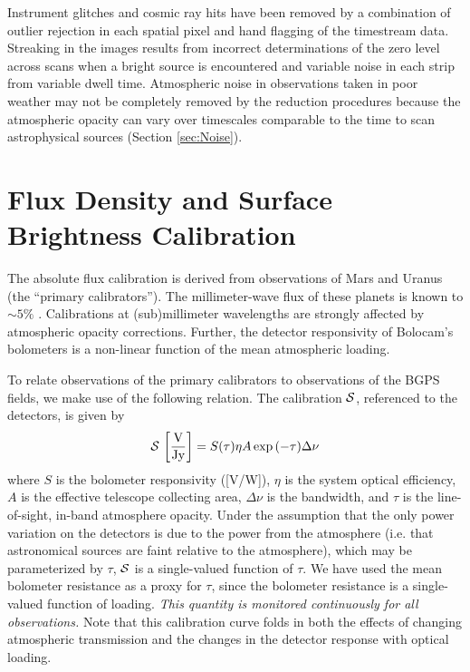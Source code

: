 \documentclass[12pt,preprint]{aastex}
\begin{document}
Instrument glitches and cosmic ray hits have been removed by a combination of
outlier rejection in each spatial pixel and hand flagging of the timestream
data.  Streaking in the images results from incorrect determinations of the
zero level across scans when a bright source is encountered and variable noise
in each strip from variable dwell time.  Atmospheric noise in observations
taken in poor weather may not be completely removed by the reduction procedures
because the atmospheric opacity can vary over timescales comparable to the time
to scan astrophysical sources (Section \ref{sec:Noise}).

\section{Flux Density and Surface Brightness Calibration}
\label{sec:FluxCalibration}

The absolute flux calibration is derived from observations of Mars
and Uranus
(the ``primary calibrators'').  The millimeter-wave flux of these
planets is known to $\sim 5\%$ \citep{orton86,griffin93}.
Calibrations at (sub)millimeter wavelengths are strongly affected by
atmospheric opacity corrections.  Further, the detector responsivity
of Bolocam's bolometers is a non-linear function of the mean
atmospheric loading.

To relate observations of the primary calibrators to observations of
the BGPS fields, we make use of the following relation.  The
calibration ${\cal S}$, referenced to the detectors, is given by
\begin{equation}
\label{eq:Calibration}
{\cal S} \, \left[\mathrm{\frac{V}{Jy}}\right] = 
S(\tau) \eta A \exp{(-\tau)} \Delta\nu
\end{equation}
where $S$ is the bolometer responsivity ([V/W]), $\eta$ is the system
optical efficiency, $A$ is the effective telescope collecting area,
$\Delta \nu$ is the bandwidth, and $\tau$ is the line-of-sight,
in-band atmosphere opacity.  Under the assumption that the only power
variation on the detectors is due to the power from the atmosphere (i.e.
that astronomical sources are faint relative to the atmosphere),
which may be parameterized by $\tau$, ${\cal S}$ is a single-valued
function of $\tau$.  We have used the mean bolometer resistance as a
proxy for $\tau$, since the bolometer resistance is a single-valued
function of loading.  {\it This quantity is monitored continuously for
all observations.}  Note that this calibration curve folds in both the
effects of changing atmospheric transmission and the changes in
the detector response with optical loading.
\end{document}
